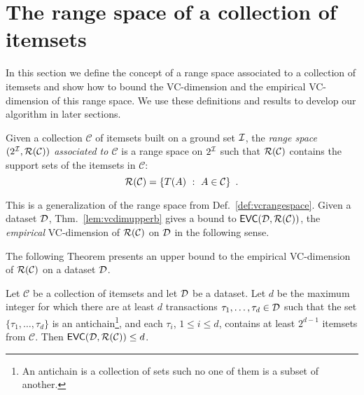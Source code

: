\section{The range space of a collection of itemsets}\label{sec:range}
In this section we define the concept of a range space associated to a
collection of itemsets and show how to bound the VC-dimension and the
empirical VC-dimension of this range space. We use these definitions and results
to develop our algorithm in later sections.

\begin{definition}\label{def:rangeset}
Given a collection $\mathcal{C}$ of itemsets built on a ground set ${\cal I}$, the
\emph{range space $(2^{\cal I},\mathcal{R}(\mathcal{C}))$ associated to $\mathcal{C}$} is a range
space on $2^{\cal I}$ such that $\mathcal{R}(\mathcal{C})$ contains the support sets of
the itemsets in $\mathcal{C}$:
\[\mathcal{R}(\mathcal{C})=\{T(A) ~:~ A\in\mathcal{C}\}\enspace.\]
\end{definition}
This is a generalization of the range space from Def.~\ref{def:vcrangespace}.
Given a dataset ${\cal D}$, Thm.~\ref{lem:vcdimupperb} gives a bound to
$\mathsf{EVC}({\cal D},\mathcal{R}(\mathcal{C}))$, the \emph{empirical} VC-dimension of
$\mathcal{R}(\mathcal{C})$ on ${\cal D}$ in the following sense.

The following Theorem presents an upper bound to the empirical VC-dimension of
$\mathcal{R}(\mathcal{C})$ on a dataset ${\cal D}$.

\begin{theorem}\label{lem:evcdimupbound}
  Let $\mathcal{C}$ be a collection of itemsets and let ${\cal D}$ be a dataset. Let
  $d$ be the maximum integer for which there are at least $d$
  transactions $\tau_1,\dotsc,\tau_d\in {\cal D}$ such that the set
  $\{\tau_1,\dotsc,\tau_d\}$ is an antichain\footnote{An antichain is a
  collection of sets such no one of them is a subset of another.}, and each $\tau_i$, $1\le i\le d$,
  contains at least $2^{d-1}$ itemsets from $\mathcal{C}$. 
  Then $\mathsf{EVC}({\cal D},\mathcal{R}(\mathcal{C}))\le d$.
\end{theorem}

